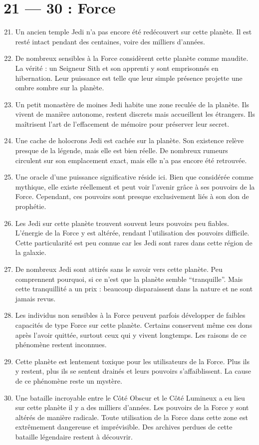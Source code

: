 \documentclass{article}
\begin{document}
\section*{21 --- 30 : Force}
\begin{enumerate}
	\setcounter{enumi}{20}
	\item Un ancien temple Jedi n’a pas encore été redécouvert sur cette planète. Il est resté intact pendant des centaines, voire des milliers d’années.
	\item De nombreux sensibles à la Force considèrent cette planète comme maudite. La vérité : un Seigneur Sith et son apprenti y sont emprisonnés en hibernation. Leur puissance est telle que leur simple présence projette une ombre sombre sur la planète.
	\item Un petit monastère de moines Jedi habite une zone reculée de la planète. Ils vivent de manière autonome, restent discrets mais accueillent les étrangers. Ils maîtrisent l’art de l’effacement de mémoire pour préserver leur secret.
	\item Une cache de holocrons Jedi est cachée sur la planète. Son existence relève presque de la légende, mais elle est bien réelle. De nombreux rumeurs circulent sur son emplacement exact, mais elle n’a pas encore été retrouvée.
	\item Une oracle d’une puissance significative réside ici. Bien que considérée comme mythique, elle existe réellement et peut voir l’avenir grâce à ses pouvoirs de la Force. Cependant, ces pouvoirs sont presque exclusivement liés à son don de prophétie.
	\item Les Jedi sur cette planète trouvent souvent leurs pouvoirs peu fiables. L’énergie de la Force y est altérée, rendant l’utilisation des pouvoirs difficile. Cette particularité est peu connue car les Jedi sont rares dans cette région de la galaxie.
	\item De nombreux Jedi sont attirés sans le savoir vers cette planète. Peu comprennent pourquoi, si ce n’est que la planète semble “tranquille”. Mais cette tranquillité a un prix : beaucoup disparaissent dans la nature et ne sont jamais revus.
	\item Les individus non sensibles à la Force peuvent parfois développer de faibles capacités de type Force sur cette planète. Certains conservent même ces dons après l’avoir quittée, surtout ceux qui y vivent longtemps. Les raisons de ce phénomène restent inconnues.
	\item Cette planète est lentement toxique pour les utilisateurs de la Force. Plus ils y restent, plus ils se sentent drainés et leurs pouvoirs s’affaiblissent. La cause de ce phénomène reste un mystère.
	\item Une bataille incroyable entre le Côté Obscur et le Côté Lumineux a eu lieu sur cette planète il y a des milliers d’années. Les pouvoirs de la Force y sont altérés de manière radicale. Toute utilisation de la Force dans cette zone est extrêmement dangereuse et imprévisible. Des archives perdues de cette bataille légendaire restent à découvrir.
\end{enumerate}
\end{document}

